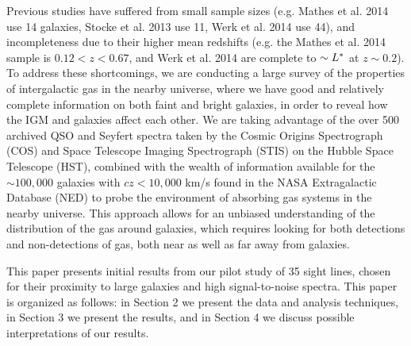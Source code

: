 \documentclass[iop]{emulateapj-rtx4}
\begin{document}
Previous studies have suffered from small sample sizes (e.g. Mathes et al. 2014 use 14 galaxies, Stocke et al. 2013 use 11, Werk et al. 2014 use 44), and incompleteness due to their higher mean redshifts (e.g. the Mathes et al. 2014 sample is $0.12 <z<0.67$, and Werk et al. 2014 are complete to $\sim L^{\**}$ at $z\sim0.2$). To address these shortcomings, we are conducting a large survey of the properties of intergalactic gas in the nearby universe, where we have good and relatively complete information on both faint and bright galaxies, in order to reveal how the IGM and galaxies affect each other. We are taking advantage of the over 500 archived QSO and Seyfert spectra taken by the Cosmic Origins Spectrograph (COS) and Space Telescope Imaging Spectrograph (STIS) on the Hubble Space Telescope (HST), combined with the wealth of information available for the $\sim100,000$ galaxies with $cz<10,000$ km/s found in the NASA Extragalactic Database (NED) to probe the environment of absorbing gas systems in the nearby universe. This approach allows for an unbiased understanding of the distribution of the gas around galaxies, which requires looking for both detections and non-detections of gas, both near as well as far away from galaxies.

This paper presents initial results from our pilot study of 35 sight lines, chosen for their proximity to large galaxies and high signal-to-noise spectra. This paper is organized as follows: in Section 2 we present the data and analysis techniques, in Section 3 we present the results, and in Section 4 we discuss possible interpretations of our results.


\end{document}
